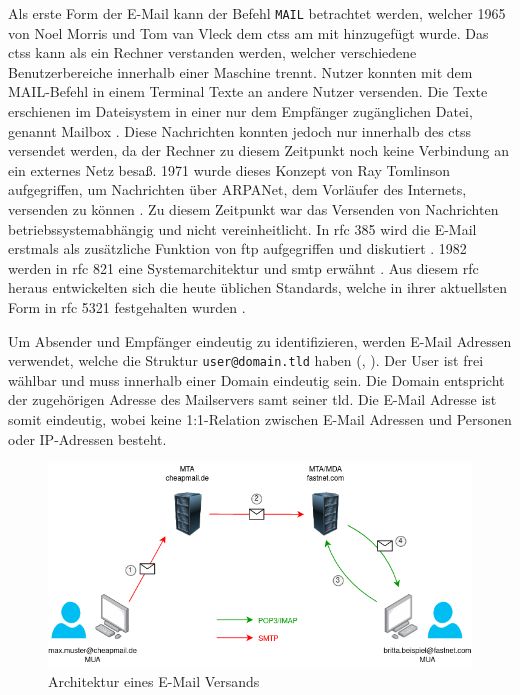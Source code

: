 Als erste Form der E-Mail kann der Befehl \texttt{MAIL} betrachtet werden, welcher 1965 von Noel Morris und Tom van Vleck dem \acrfull{ctss} am \acrshort{mit} hinzugefügt wurde. Das \acrshort{ctss} kann als ein Rechner verstanden werden, welcher verschiedene Benutzerbereiche innerhalb einer Maschine trennt. Nutzer konnten mit dem MAIL-Befehl in einem Terminal Texte an andere Nutzer versenden. Die Texte erschienen im Dateisystem in einer nur dem Empfänger zugänglichen Datei, genannt Mailbox \citep[S. 4]{Vleck2012}. Diese Nachrichten konnten jedoch nur innerhalb des \acrshort{ctss} versendet werden, da der Rechner zu diesem Zeitpunkt noch keine Verbindung an ein externes Netz besaß. 1971 wurde dieses Konzept von Ray Tomlinson aufgegriffen, um Nachrichten über ARPANet, dem Vorläufer des Internets, versenden zu können \citep[S. 4 ff.]{Partridge2008}. Zu diesem Zeitpunkt war das Versenden von Nachrichten betriebssystemabhängig und nicht vereinheitlicht. In \acrshort{rfc} 385 wird die E-Mail erstmals als zusätzliche Funktion von \acrshort{ftp} aufgegriffen und diskutiert \citep[S. 3 f.]{RFC385}. 1982 werden in \acrshort{rfc} 821 eine Systemarchitektur und \acrshort{smtp} erwähnt \citep[S. 2 ff.]{RFC821}. Aus diesem \acrshort{rfc} heraus entwickelten sich die heute üblichen Standards, welche in ihrer aktuellsten Form in \acrshort{rfc} 5321 festgehalten wurden \citep{RFC5321}.

Um Absender und Empfänger eindeutig zu identifizieren, werden E-Mail Adressen verwendet, welche die Struktur \texttt{user@domain.tld} haben (\cite[S. 4 f.]{RFC822}, \cite[S. 2 ff.]{RFC2142}). Der User ist frei wählbar und muss innerhalb einer Domain eindeutig sein. Die Domain entspricht der zugehörigen Adresse des Mailservers samt seiner \acrfull{tld}. Die E-Mail Adresse ist somit eindeutig, wobei keine 1:1-Relation zwischen E-Mail Adressen und Personen oder IP-Adressen besteht.

\begin{figure}[!ht]
	\centering
		\includegraphics[width=1\textwidth]{Figures/E-Mail Versand.png}
	\caption{Architektur eines E-Mail Versands}
	\label{fig:mail_architektur}
\end{figure}

